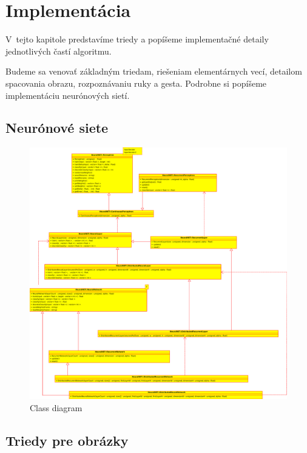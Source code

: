 \chapter{Implementácia}\label{chap:implementation}

V~tejto kapitole predstavíme triedy a popíšeme implementačné detaily jednotlivých častí algoritmu.

Budeme sa venovať základným triedam, riešeniam elementárnych vecí, detailom spacovania obrazu, rozpoznávaniu ruky a gesta. Podrobne si popíšeme implementáciu neurónových sietí.
\bigskip

\section{Neurónové siete}


\begin{figure}[htp]
    \centering
    \includegraphics[width=\textwidth]{images/nn_class_diagram}
    \caption{Class diagram}
    \label{fig:nnclsdiag}
\end{figure}

\section{Triedy pre obrázky}

